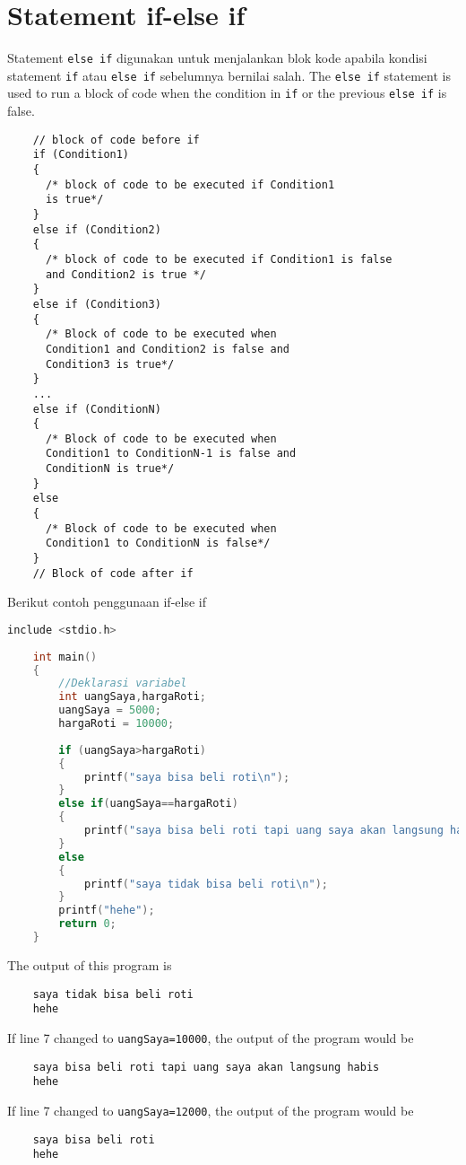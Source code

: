 \section{Statement if-else if}
Statement \verb|else if| digunakan untuk menjalankan blok kode apabila kondisi statement \verb|if| atau \verb|else if| sebelumnya bernilai salah.
The \verb|else if| statement is used to run a block of code when the condition in \verb|if| or the previous \verb|else if| is false.
\begin{verbatim}
	// block of code before if
    if (Condition1)
    {
	  /* block of code to be executed if Condition1
	  is true*/
    }
    else if (Condition2)
    {
	  /* block of code to be executed if Condition1 is false
	  and Condition2 is true */
    }
    else if (Condition3)
    {
	  /* Block of code to be executed when
	  Condition1 and Condition2 is false and
	  Condition3 is true*/
    }
    ...
    else if (ConditionN)
    {
	  /* Block of code to be executed when
	  Condition1 to ConditionN-1 is false and
	  ConditionN is true*/
    }
    else
    {
	  /* Block of code to be executed when
	  Condition1 to ConditionN is false*/
    }
	// Block of code after if
\end{verbatim}
Berikut contoh penggunaan if-else if
\begin{lstlisting}[language=c,caption = if-else if example,label=lst:ifelseifexample01]
	include <stdio.h>
	
	int main()
	{
		//Deklarasi variabel 
		int uangSaya,hargaRoti;
		uangSaya = 5000;
		hargaRoti = 10000;
		
		if (uangSaya>hargaRoti)
		{
		    printf("saya bisa beli roti\n");
		}
		else if(uangSaya==hargaRoti)
		{
		    printf("saya bisa beli roti tapi uang saya akan langsung habis\n");
		}
		else
		{
	        printf("saya tidak bisa beli roti\n");	
		}
		printf("hehe");
		return 0;
	}
\end{lstlisting}                        
The output of this program is
\begin{verbatim}
    saya tidak bisa beli roti
    hehe
\end{verbatim}
If line 7 changed to \verb|uangSaya=10000|, the output of the program would be
\begin{verbatim}
    saya bisa beli roti tapi uang saya akan langsung habis
    hehe
\end{verbatim}
If line 7 changed to \verb|uangSaya=12000|, the output of the program would be
\begin{verbatim}
    saya bisa beli roti
    hehe
\end{verbatim}

